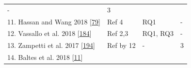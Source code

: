 \documentclass[]{book}
\begin{document}
\begin{longtable}[]{@{}llll@{}}
\begin{minipage}[t]{0.14\columnwidth}
-\strut
\end{minipage} & \begin{minipage}[t]{0.06\columnwidth}\raggedright\strut
3\strut
\end{minipage}\tabularnewline
\begin{minipage}[t]{0.48\columnwidth}\raggedright\strut
11. Hassan and Wang 2018
{[}\protect\hyperlink{ref-hassan2018hirebuild}{79}{]}\strut
\end{minipage} & \begin{minipage}[t]{0.20\columnwidth}\raggedright\strut
Ref 4\strut
\end{minipage} & \begin{minipage}[t]{0.14\columnwidth}\raggedright\strut
RQ1\strut
\end{minipage} & \begin{minipage}[t]{0.06\columnwidth}\raggedright\strut
-\strut
\end{minipage}\tabularnewline
\begin{minipage}[t]{0.48\columnwidth}\raggedright\strut
12. Vassallo et al. 2018
{[}\protect\hyperlink{ref-vassallo2018break}{184}{]}\strut
\end{minipage} & \begin{minipage}[t]{0.20\columnwidth}\raggedright\strut
Ref 2,3\strut
\end{minipage} & \begin{minipage}[t]{0.14\columnwidth}\raggedright\strut
RQ1, RQ3\strut
\end{minipage} & \begin{minipage}[t]{0.06\columnwidth}\raggedright\strut
-\strut
\end{minipage}\tabularnewline
\begin{minipage}[t]{0.48\columnwidth}\raggedright\strut
13. Zampetti et al. 2017
{[}\protect\hyperlink{ref-zampetti2017open}{194}{]}\strut
\end{minipage} & \begin{minipage}[t]{0.20\columnwidth}\raggedright\strut
Ref by 12\strut
\end{minipage} & \begin{minipage}[t]{0.14\columnwidth}\raggedright\strut
-\strut
\end{minipage} & \begin{minipage}[t]{0.06\columnwidth}\raggedright\strut
3\strut
\end{minipage}\tabularnewline
\begin{minipage}[t]{0.48\columnwidth}\raggedright\strut
14. Baltes et al. 2018
{[}\protect\hyperlink{ref-baltes2018no}{11}{]}\strut

\end{minipage}
\end{longtable}
\end{document}
